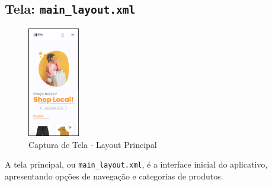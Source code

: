\documentclass[
	12pt,				%
	openright,			%
	twoside,			%
	a4paper,			%
	english,			%
	brazil				%
	]{abntex2}
\begin{document}
\subsection{Tela: \texttt{main\_layout.xml}}

\begin{figure}[htb]
    \centering
    \includegraphics[width=0.2\textwidth]{img/main_layout}
    \caption{Captura de Tela - Layout Principal}
\end{figure}

A tela principal, ou \texttt{main\_layout.xml}, é a interface inicial do aplicativo, apresentando opções de navegação e categorias de produtos.
\end{document}
